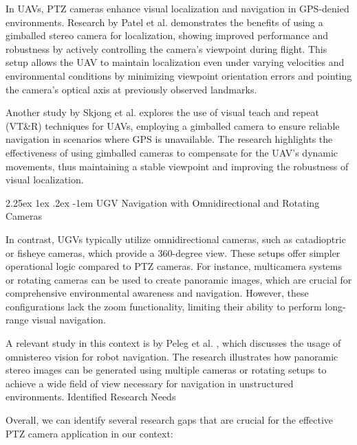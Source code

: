 \documentclass[runningheads]{llncs}
\makeatletter
\renewcommand\paragraph{\@startsection{paragraph}{4}{\z@}%
                                    {2.25ex \@plus1ex \@minus.2ex}%
                                    {-1em}%
                                    {\normalfont\normalsize\bfseries}}
\makeatother
\begin{document}
In UAVs, PTZ cameras enhance visual localization and navigation in GPS-denied environments. Research by Patel et al. \cite{PointMeIntoRightDirection} demonstrates the benefits of using a gimballed stereo camera for localization, showing improved performance and robustness by actively controlling the camera’s viewpoint during flight. This setup allows the UAV to maintain localization even under varying velocities and environmental conditions by minimizing viewpoint orientation errors and pointing the camera's optical axis at previously observed landmarks.

Another study by Skjong et al. \cite{SearchAndTrackingGimbal} explores the use of visual teach and repeat (VT\&R) techniques for UAVs, employing a gimballed camera to ensure reliable navigation in scenarios where GPS is unavailable. The research highlights the effectiveness of using gimballed cameras to compensate for the UAV's dynamic movements, thus maintaining a stable viewpoint and improving the robustness of visual localization.


\paragraph{UGV Navigation with Omnidirectional and Rotating Cameras}

In contrast, UGVs typically utilize omnidirectional cameras, such as catadioptric or fisheye cameras, which provide a 360-degree view. These setups offer simpler operational logic compared to PTZ cameras. For instance, multicamera systems or rotating cameras can be used to create panoramic images, which are crucial for comprehensive environmental awareness and navigation. However, these configurations lack the zoom functionality, limiting their ability to perform long-range visual navigation.

A relevant study in this context is by Peleg et al. \cite{Omnistereo_Shmuel}, which discusses the usage of omnistereo vision for robot navigation. The research illustrates how panoramic stereo images can be generated using multiple cameras or rotating setups to achieve a wide field of view necessary for navigation in unstructured environments.
Identified Research Needs

Overall, we can identify several research gaps that are crucial for the effective PTZ camera application in our context:
\end{document}
